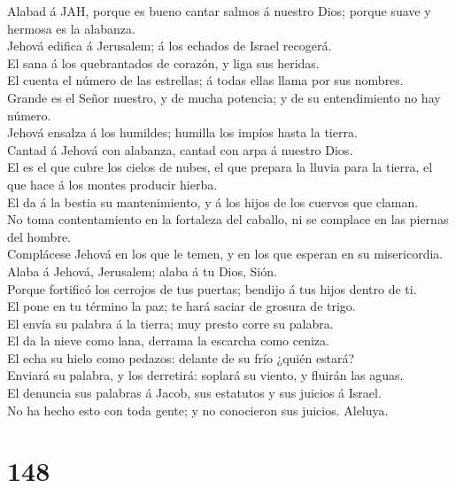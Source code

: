  Alabad á JAH, porque es bueno cantar salmos á nuestro Dios;
porque suave y hermosa es la alabanza.\\
 Jehová edifica á Jerusalem; á los echados de Israel
recogerá.\\
 El sana á los quebrantados de corazón, y liga sus
heridas.\\
 El cuenta el número de las estrellas; á todas ellas llama
por sus nombres.\\
 Grande es el Señor nuestro, y de mucha potencia; y de su
entendimiento no hay número.\\
 Jehová ensalza á los humildes; humilla los impíos hasta la
tierra.\\
 Cantad á Jehová con alabanza, cantad con arpa á nuestro
Dios.\\
 El es el que cubre los cielos de nubes, el que prepara la
lluvia para la tierra, el que hace á los montes producir hierba.\\
 El da á la bestia su mantenimiento, y á los hijos de los
cuervos que claman.\\
 No toma contentamiento en la fortaleza del caballo, ni se
complace en las piernas del hombre.\\
 Complácese Jehová en los que le temen, y en los que
esperan en su misericordia.\\
 Alaba á Jehová, Jerusalem; alaba á tu Dios, Sión.\\
 Porque fortificó los cerrojos de tus puertas; bendijo á
tus hijos dentro de ti.\\
 El pone en tu término la paz; te hará saciar de grosura de
trigo.\\
 El envía su palabra á la tierra; muy presto corre su
palabra.\\
 El da la nieve como lana, derrama la escarcha como
ceniza.\\
 El echa su hielo como pedazos: delante de su frío ¿quién
estará?\\
 Enviará su palabra, y los derretirá: soplará su viento, y
fluirán las aguas.\\
 El denuncia sus palabras á Jacob, sus estatutos y sus
juicios á Israel.\\
 No ha hecho esto con toda gente; y no conocieron sus
juicios. Aleluya.

\hypertarget{section-147}{%
\section{148}\label{section-147}}

